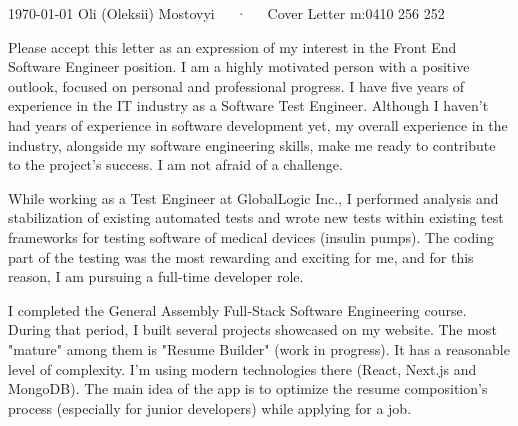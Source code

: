 \documentclass[10pt, a4paper]{awesome-cv}
\begin{document}
\makecvheader[R]

\makecvfooter
  {\today}
  {Oli (Oleksii) Mostovyi~~~·~~~Cover Letter}
  {m:0410 256 252}

\makelettertitle

\begin{cvletter}
Please accept this letter as an expression of my interest in the Front End Software Engineer position.
I am a highly motivated person with a positive outlook, focused on personal and professional progress. I have five years of experience in the IT industry as a Software Test Engineer. Although I haven't had years of experience in software development yet, my overall experience in the industry, alongside my software engineering skills, make me ready to contribute to the project's success. I am not afraid of a challenge. 

While working as a Test Engineer at GlobalLogic Inc., I performed analysis and stabilization of existing automated tests and wrote new tests within existing test frameworks for testing software of medical devices (insulin pumps). The coding part of the testing was the most rewarding and exciting for me, and for this reason, I am pursuing a full‐time developer role. 

I completed the General Assembly Full‐Stack Software Engineering course. During that period, I built several projects showcased on my website. The most "mature" among them is "Resume Builder" (work in progress). It has a reasonable level of complexity. I'm using modern technologies there (React, Next.js and MongoDB). The main idea of the app is to optimize the resume composition's process (especially for junior developers) while applying for a job. 


\end{cvletter}
\end{document}
